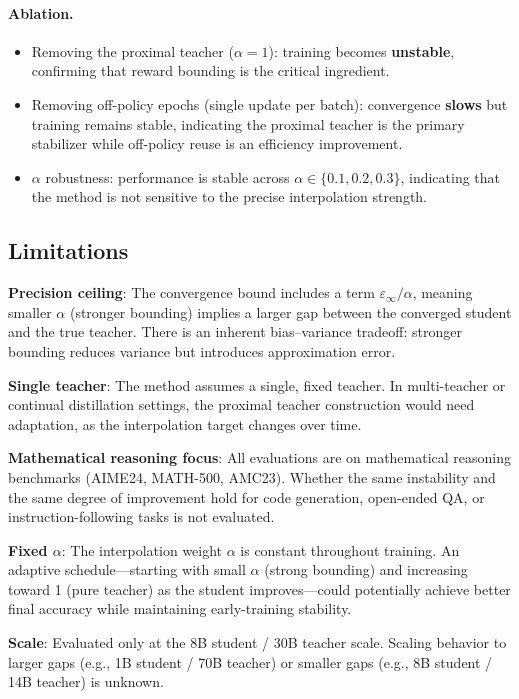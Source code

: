 \documentclass[11pt,a4paper]{article}
\begin{document}
\paragraph{Ablation.}
\begin{itemize}
\item Removing the proximal teacher ($\alpha = 1$): training becomes \textbf{unstable}, confirming that reward bounding is the critical ingredient.
\item Removing off-policy epochs (single update per batch): convergence \textbf{slows} but training remains stable, indicating the proximal teacher is the primary stabilizer while off-policy reuse is an efficiency improvement.
\item $\alpha$ robustness: performance is stable across $\alpha \in \{0.1, 0.2, 0.3\}$, indicating that the method is not sensitive to the precise interpolation strength.
\end{itemize}

\subsection{Limitations}

\textbf{Precision ceiling}: The convergence bound includes a term $\varepsilon_\infty / \alpha$, meaning smaller $\alpha$ (stronger bounding) implies a larger gap between the converged student and the true teacher. There is an inherent bias--variance tradeoff: stronger bounding reduces variance but introduces approximation error.

\textbf{Single teacher}: The method assumes a single, fixed teacher. In multi-teacher or continual distillation settings, the proximal teacher construction would need adaptation, as the interpolation target changes over time.

\textbf{Mathematical reasoning focus}: All evaluations are on mathematical reasoning benchmarks (AIME24, MATH-500, AMC23). Whether the same instability and the same degree of improvement hold for code generation, open-ended QA, or instruction-following tasks is not evaluated.

\textbf{Fixed $\alpha$}: The interpolation weight $\alpha$ is constant throughout training. An adaptive schedule---starting with small $\alpha$ (strong bounding) and increasing toward 1 (pure teacher) as the student improves---could potentially achieve better final accuracy while maintaining early-training stability.

\textbf{Scale}: Evaluated only at the 8B student / 30B teacher scale. Scaling behavior to larger gaps (e.g., 1B student / 70B teacher) or smaller gaps (e.g., 8B student / 14B teacher) is unknown.
\end{document}
